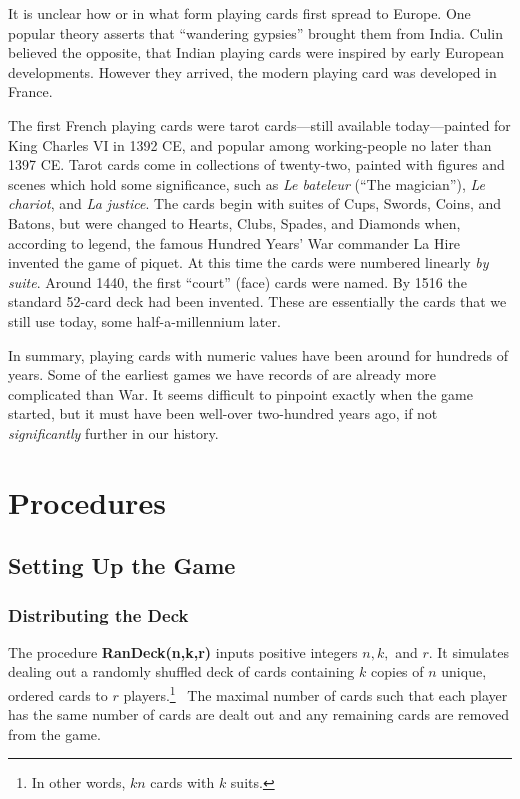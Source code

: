\documentclass[12pt]{amsart}
\begin{document}
It is unclear how or in what form playing cards first spread to Europe. One
popular theory asserts that ``wandering gypsies'' brought them from India.
Culin believed the opposite, that Indian playing cards were inspired by early
European developments. However they arrived, the modern playing card was
developed in France.


The first French playing cards were tarot cards---still available
today---painted for King Charles VI in 1392 CE, and popular among
working-people no later than 1397 CE. Tarot cards come in collections of
twenty-two, painted with figures and scenes which hold some significance, such
as \emph{Le bateleur} (``The magician''), \emph{Le chariot}, and \emph{La
justice}. The cards begin with suites of Cups, Swords, Coins, and Batons, but
were changed to Hearts, Clubs, Spades, and Diamonds when, according to legend,
the famous Hundred Years' War commander La Hire invented the game of piquet. At
this time the cards were numbered linearly \emph{by suite}. Around 1440, the
first ``court'' (face) cards were named. By 1516 the standard 52-card deck had
been invented. These are essentially the cards that we still use today, some
half-a-millennium later.

In summary, playing cards with numeric values have been around for hundreds of
years. Some of the earliest games we have records of are already more
complicated than War. It seems difficult to pinpoint exactly when the game
started, but it must have been well-over two-hundred years ago, if not
\emph{significantly} further in our history.

\section{Procedures}
\label{sec:procedures}
\subsection{Setting Up the Game}


\subsubsection{Distributing the Deck} \hfill


The procedure \textbf{RanDeck(n,k,r)} inputs positive integers $n,k,$ and $r$. It simulates dealing out a randomly shuffled deck of cards containing $k$ copies of $n$ unique, ordered cards to $r$ players.\footnote{In other words, $kn$ cards with $k$ suits.}
 The maximal number of cards such that each player has the same number of cards are dealt out and any remaining cards are removed from the game.
\end{document}
